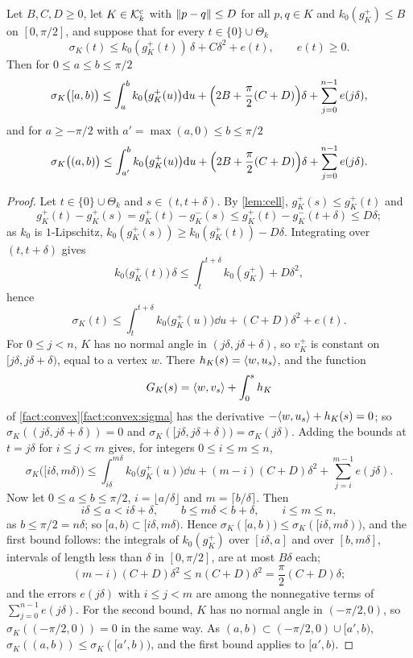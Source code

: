 \begin{lemma}\label{lem:sum}
Let $B,C,D\ge0$, let $K\in\mathcal{K}^{\mathrm{c}}_k$ with $\lVert p-q\rVert\le D$ for all $p,q\in K$ and
$k_0(g_K^+)\le B$ on $[0,\pi/2]$, and suppose that for every
$t\in\{0\}\cup\Theta_k$
\[
  \sigma_K(t)\le k_0(g_K^+(t))\,\delta+C\delta^2+e(t),\qquad e(t)\ge0 .
\]
Then for $0\le a\le b\le\pi/2$
\[
  \sigma_K\bigl([a,b)\bigr)\le\int_a^bk_0\bigl(g_K^+(u)\bigr)\mathrm{d} u+\Bigl(2B
    +\frac\pi2(C+D)\Bigr)\delta+\sum_{j=0}^{n-1}e(j\delta),
\]
and for $a\ge-\pi/2$ with $a'=\max(a,0)\le b\le\pi/2$
\[
  \sigma_K\bigl((a,b)\bigr)\le\int_{a'}^bk_0\bigl(g_K^+(u)\bigr)\mathrm{d} u+\Bigl(2B
    +\frac\pi2(C+D)\Bigr)\delta+\sum_{j=0}^{n-1}e(j\delta).
\]
\end{lemma}

\begin{proof}
Let $t\in\{0\}\cup\Theta_k$ and $s\in(t,t+\delta)$. By \cref{lem:cell},
$g_K^+(s)\le g_K^+(t)$ and
\[
  g_K^+(t)-g_K^+(s)=g_K^+(t)-g_K^-(s)\le g_K^+(t)-g_K^-(t+\delta)\le D\delta;
\]
as $k_0$ is $1$-Lipschitz, $k_0(g_K^+(s))\ge k_0(g_K^+(t))-D\delta$. Integrating
over $(t,t+\delta)$ gives
\[
  k_0\bigl(g_K^+(t)\bigr)\,\delta\le\int_t^{t+\delta}k_0(g_K^+)+D\delta^2,
\]
hence
\[
  \sigma_K(t)\le\int_t^{t+\delta}k_0\bigl(g_K^+(u)\bigr)\dd u+(C+D)\delta^2
    +e(t).
\]
For $0\le j<n$, $K$ has no normal angle in $(j\delta,j\delta+\delta)$, so
$v_K^+$ is constant on $[j\delta,j\delta+\delta)$, equal to a vertex $w$. There
$h_K(s)=\langle w,u_s\rangle$, and the function
\[
  G_K(s)=\langle w,v_s\rangle+\int_0^sh_K
\]
of \cref{fact:convex}\ref{fact:convex:sigma} has the derivative
$-\langle w,u_s\rangle+h_K(s)=0$; so $\sigma_K((j\delta,j\delta+\delta))=0$ and
$\sigma_K([j\delta,j\delta+\delta))=\sigma_K(j\delta)$. Adding the bounds at
$t=j\delta$ for $i\le j<m$ gives, for integers $0\le i\le m\le n$,
\[
  \sigma_K\bigl([i\delta,m\delta)\bigr)
    \le\int_{i\delta}^{m\delta}k_0\bigl(g_K^+(u)\bigr)\dd u+(m-i)(C+D)\delta^2
    +\sum_{j=i}^{m-1}e(j\delta).
\]
Now let $0\le a\le b\le\pi/2$, $i=\lfloor a/\delta\rfloor$ and
$m=\lceil b/\delta\rceil$. Then
\[
  i\delta\le a<i\delta+\delta,\qquad b\le m\delta<b+\delta,\qquad i\le m\le n,
\]
as $b\le\pi/2=n\delta$; so $[a,b)\subset[i\delta,m\delta)$. Hence
$\sigma_K([a,b))\le\sigma_K([i\delta,m\delta))$, and the first bound follows:
the integrals of $k_0(g_K^+)$ over $[i\delta,a]$ and over $[b,m\delta]$,
intervals of length less than $\delta$ in $[0,\pi/2]$, are at most $B\delta$
each;
\[
  (m-i)(C+D)\delta^2\le n(C+D)\delta^2=\frac\pi2(C+D)\delta;
\]
and the errors $e(j\delta)$ with $i\le j<m$ are among the nonnegative terms of
$\sum_{j=0}^{n-1}e(j\delta)$. For the second bound, $K$ has no normal angle in
$(-\pi/2,0)$, so $\sigma_K((-\pi/2,0))=0$ in the same way. As
$(a,b)\subset(-\pi/2,0)\cup[a',b)$, $\sigma_K((a,b))\le\sigma_K([a',b))$, and
the first bound applies to $[a',b)$.
\end{proof}

